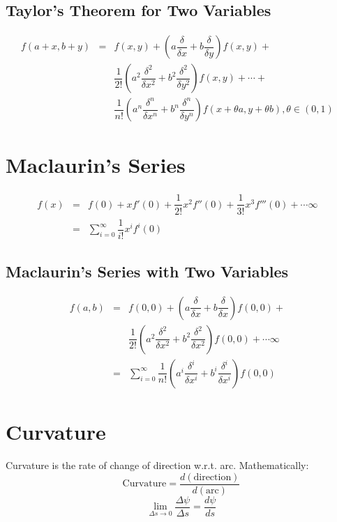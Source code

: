 \subsection{Taylor's Theorem for Two Variables}
\begin{equation}
	\begin{aligned}
			f(a+x,b+y)& = &f(x,y)+\left( a\dfrac{\delta}{\delta x}+b\dfrac{\delta}{\delta y}\right)f (x,y)+&\\
			& &\dfrac{1}{2!}\left( a^2\dfrac{\delta^2}{\delta x^2}+b^2\dfrac{\delta^2}{\delta y^2}\right) f(x,y)+\cdots+&\\
			& &\dfrac{1}{n!}\left( a^n\dfrac{\delta^n}{\delta x^n}+b^n\dfrac{\delta^n}{\delta y^n}\right) f(x+\theta a,y+\theta b), \theta \in (0,1)
	\end{aligned}
\end{equation}


\section{Maclaurin's Series}
\begin{equation}
	\begin{aligned}
			f(x)&=&f(0)+xf'(0)+\dfrac{1}{2!}x^2f''(0)+\dfrac{1}{3!}x^3f'''(0)+\cdots\infty&\\
			&=& \sum_{i=0}^\infty \dfrac{1}{i!} x^i f^i(0)
	\end{aligned}
\end{equation}

\subsection{Maclaurin's Series with Two Variables}
\begin{equation}
	\begin{aligned}
			f(a,b)&=&f(0,0)+\left(a\dfrac{\delta}{\delta x}+b\dfrac{\delta}{\delta x}\right)f(0,0)+&\\& &\dfrac{1}{2!}\left(a^2\dfrac{\delta^2}{\delta x^2}+b^2\dfrac{\delta^2}{\delta x^2}\right)f(0,0)+\cdots\infty&\\
			& = & \sum_{i=0}^\infty \dfrac{1}{n!}\left(a^i\dfrac{\delta^i}{\delta x^i}+b^i\dfrac{\delta^i}{\delta x^i}\right)f(0,0)
	\end{aligned}
\end{equation}


\section{Curvature}
Curvature is the rate of change of direction w.r.t. arc. Mathematically:
\begin{equation}
	\text{Curvature}=\dfrac{d(\text{direction})}{d(\text{arc})}\nonumber
\end{equation}
\begin{equation}
	\lim_{\Delta s \to 0} \dfrac{\Delta \psi}{\Delta s}=\dfrac{d\psi}{ds}
\end{equation}

